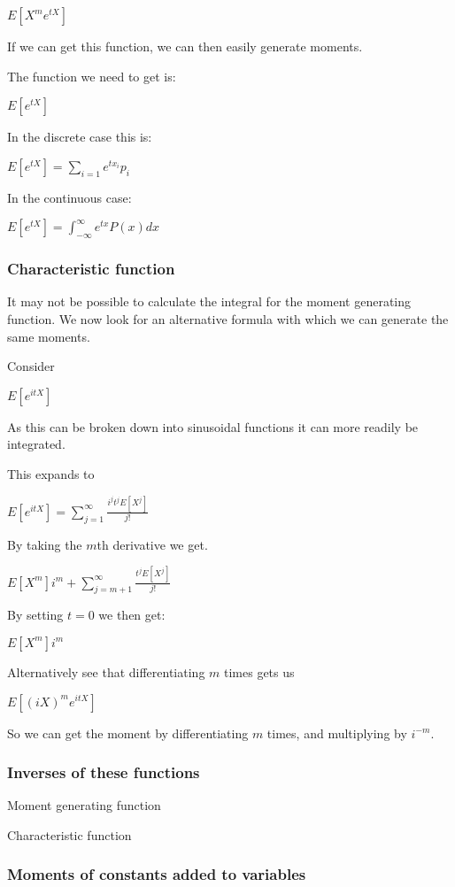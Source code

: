 $E[X^me^{tX}]$

If we can get this function, we can then easily generate moments.

The function we need to get is:

$E[e^{tX}]$

In the discrete case this is:

$E[e^{tX}]=\sum_{i=1}e^{tx_i}p_i$

In the continuous case:

$E[e^{tX}]=\int_{-\infty }^\infty e^{tx}P(x) dx$

\subsubsection{Characteristic function}

It may not be possible to calculate the integral for the moment generating function. We now look for an alternative formula with which we can generate the same moments.

Consider

$E[e^{itX}]$

As this can be broken down into sinusoidal functions it can more readily be integrated.

This expands to

$E[e^{itX}]=\sum_{j=1}^\infty \frac{i^jt^jE[X^j]}{j!}$

By taking the \(m\)th derivative we get.

$E[X^m]i^m+\sum_{j=m+1}^\infty \frac{t^jE[X^j]}{j!}$

By setting \(t=0\) we then get:

$E[X^m]i^m$

Alternatively see that differentiating \(m\) times gets us

$E[(iX)^me^{itX}]$

So we can get the moment by differentiating \(m\) times, and multiplying by \(i^{-m}\).

\subsubsection{Inverses of these functions}

Moment generating function

Characteristic function

\subsubsection{Moments of constants added to variables}

